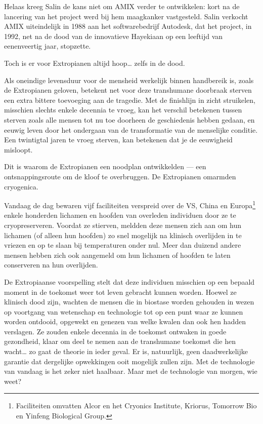 \documentclass[
  a5paper,
  smalldemyvopaper,11pt,twoside,onecolumn,openright,extrafontsizes,
hidelinks]{memoir}
\begin{document}
Helaas kreeg Salin de kans niet om AMIX verder te ontwikkelen: kort na
de lancering van het project werd bij hem maagkanker vastgesteld. Salin
verkocht AMIX uiteindelijk in 1988 aan het softwarebedrijf Autodesk, dat
het project, in 1992, net na de dood van de innovatieve Hayekiaan op een
leeftijd van eenenveertig jaar, stopzette.

Toch is er voor Extropianen altijd hoop\ldots{} zelfs in de dood.

Als oneindige levensduur voor de mensheid werkelijk binnen handbereik
is, zoals de Extropianen geloven, betekent net voor deze transhumane
doorbraak sterven een extra bittere toevoeging aan de tragedie. Met de
finishlijn in zicht struikelen, misschien slechts enkele decennia te
vroeg, kan het verschil betekenen tussen sterven zoals alle mensen tot
nu toe doorheen de geschiedenis hebben gedaan, en eeuwig leven door het
ondergaan van de transformatie van de menselijke conditie. Een
twintigtal jaren te vroeg sterven, kan betekenen dat je de eeuwigheid
misloopt.

Dit is waarom de Extropianen een noodplan ontwikkelden --- een
ontsnappingsroute om de kloof te overbruggen. De Extropianen omarmden
cryogenica.

Vandaag de dag bewaren vijf faciliteiten verspreid over de VS, China en
Europa\footnote{Faciliteiten omvatten Alcor en het Cryonics Institute,
  Kriorus, Tomorrow Bio en Yinfeng Biological Group.} enkele honderden
lichamen en hoofden van overleden individuen door ze te cryopreserveren.
Voordat ze stierven, meldden deze mensen zich aan om hun lichamen (of
alleen hun hoofden) zo snel mogelijk na klinisch overlijden in te
vriezen en op te slaan bij temperaturen onder nul. Meer dan duizend
andere mensen hebben zich ook aangemeld om hun lichamen of hoofden te
laten conserveren na hun overlijden.

De Extropiaanse voorspelling stelt dat deze individuen misschien op een
bepaald moment in de toekomst weer tot leven gebracht kunnen worden.
Hoewel ze klinisch dood zijn, wachten de mensen die in biostase worden
gehouden in wezen op voortgang van wetenschap en technologie tot op een
punt waar ze kunnen worden ontdooid, opgewekt en genezen van welke
kwalen dan ook hen hadden verslagen. Ze zouden enkele decennia in de
toekomst ontwaken in goede gezondheid, klaar om deel te nemen aan de
transhumane toekomst die hen wacht\ldots{} zo gaat de theorie in ieder
geval. Er is, natuurlijk, geen daadwerkelijke garantie dat dergelijke
opwekkingen ooit mogelijk zullen zijn. Met de technologie van vandaag is
het zeker niet haalbaar. Maar met de technologie van morgen, wie weet?
\end{document}
